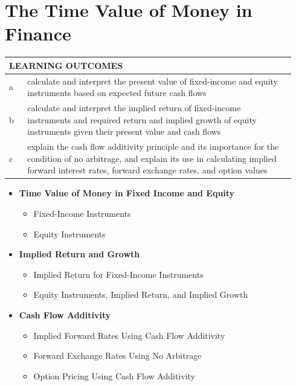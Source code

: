 \chapter{The Time Value of Money in Finance}
\label{chap:The Time Value of Money in Finance}

\begin{center}
\begin{tabular}{p{0.06\linewidth} | p{0.88\linewidth}}
	\toprule
	\multicolumn{2}{l}{\textbf{LEARNING OUTCOMES}} \\
	\midrule
	a & calculate and interpret the present value of fixed-income and equity instruments based on expected future cash flows \\
	\midrule
	b & calculate and interpret the implied return of fixed-income instruments and required return and implied growth of equity instruments given their present value and cash flows \\
	\midrule
	c & explain the cash flow additivity principle and its importance for the condition of no arbitrage, and explain its use in calculating implied forward interest rates, forward exchange rates, and option values \\
	\bottomrule
\end{tabular}
\end{center}

\vspace{1.5em}

\begin{itemize}
	\item[] \textbf{Time Value of Money in Fixed Income and Equity}
	      \begin{itemize}
		      \item[] Fixed-Income Instruments
		      \item[] Equity Instruments
	      \end{itemize}
	\item[] \textbf{Implied Return and Growth}
	      \begin{itemize}
		      \item[] Implied Return for Fixed-Income Instruments
		      \item[] Equity Instruments, Implied Return, and Implied Growth
	      \end{itemize}
	\item[] \textbf{Cash Flow Additivity}
	      \begin{itemize}
		      \item[] Implied Forward Rates Using Cash Flow Additivity
		      \item[] Forward Exchange Rates Using No Arbitrage
		      \item[] Option Pricing Using Cash Flow Additivity
	      \end{itemize}
\end{itemize}

